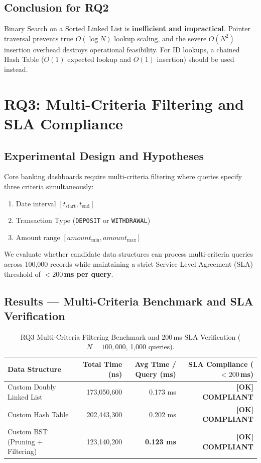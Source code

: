 \documentclass[11pt]{article}
\begin{document}
\subsection{Conclusion for RQ2}
Binary Search on a Sorted Linked List is \textbf{inefficient and impractical}. Pointer traversal prevents true $O(\log N)$ lookup scaling, and the severe $O(N^2)$ insertion overhead destroys operational feasibility. For ID lookups, a chained Hash Table ($O(1)$ expected lookup and $O(1)$ insertion) should be used instead.

\section{RQ3: Multi-Criteria Filtering and SLA Compliance}

\subsection{Experimental Design and Hypotheses}
Core banking dashboards require multi-criteria filtering where queries specify three criteria simultaneously:
\begin{enumerate}
    \item Date interval $[t_{\text{start}}, t_{\text{end}}]$
    \item Transaction Type (\texttt{DEPOSIT} or \texttt{WITHDRAWAL})
    \item Amount range $[amount_{\text{min}}, amount_{\text{max}}]$
\end{enumerate}
We evaluate whether candidate data structures can process multi-criteria queries across 100,000 records while maintaining a strict Service Level Agreement (SLA) threshold of \textbf{$< 200$\,ms per query}.

\subsection{Results --- Multi-Criteria Benchmark and SLA Verification}

\begin{table}[htbp]
\centering
\small
\begin{tabular}{lrrr}
\toprule
\textbf{Data Structure} & \textbf{Total Time (ns)} & \textbf{Avg Time / Query (ms)} & \textbf{SLA Compliance ($< 200$\,ms)} \\
\midrule
Custom Doubly Linked List & 173,050,600 & 0.173 ms & \textbf{[OK] COMPLIANT} \\
Custom Hash Table & 202,443,300 & 0.202 ms & \textbf{[OK] COMPLIANT} \\
Custom BST (Pruning + Filtering) & 123,140,200 & \textbf{0.123 ms} & \textbf{[OK] COMPLIANT} \\
\bottomrule
\end{tabular}
\caption{RQ3 Multi-Criteria Filtering Benchmark and 200\,ms SLA Verification ($N=100,000$, 1,000 queries).}
\label{tab:rq3}
\end{table}
\end{document}
